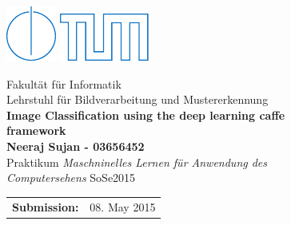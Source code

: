 \begin{figure}[!h]

  \includegraphics{pics/IN.pdf} \hfill \includegraphics{pics/tumlogo.pdf}
 
  \vspace*{1cm}
  {\large \textsf{Fakult{\"a}t f{\"u}r Informatik}}\\
  {\large \textsf{Lehrstuhl f{\"u}r Bildverarbeitung und Mustererkennung}}\\
 

  \vspace*{5cm}
%
%
%
%
  {\color{tumblue} \Huge \bf \textsf{Image Classification using the deep learning caffe framework}}\\  %

  \vspace*{1cm}
%
%
%
% 
  {\Large \bf \textsf{Neeraj Sujan - 03656452}}\\   
  
  
 
  \vspace*{8cm}
  {\Large \textsf{Praktikum \emph{Maschninelles Lernen f{\"u}r Anwendung des Computersehens} SoSe2015}}\\
 
  \vspace*{1cm} 
  \begin{tabular}{ll}
%
%
%
%


%
%
%
%
    {\Large \bf \textsf{Submission:}} &
    {\Large \textsf{08. May 2015}}

  \end{tabular}
  
\end{figure}
